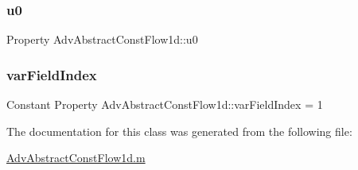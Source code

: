 \subsubsection{\texorpdfstring{u0}{u0}}
{\footnotesize\ttfamily Property Adv\+Abstract\+Const\+Flow1d\+::u0}

\mbox{\label{class_adv_abstract_const_flow1d_aedeec44e03a65428754c8db3310e48e0}} 
\subsubsection{\texorpdfstring{var\+Field\+Index}{varFieldIndex}}
{\footnotesize\ttfamily Constant Property Adv\+Abstract\+Const\+Flow1d\+::var\+Field\+Index = 1}



The documentation for this class was generated from the following file\+:\begin{DoxyCompactItemize}
\item 
\hyperlink{_adv_abstract_const_flow1d_8m}{Adv\+Abstract\+Const\+Flow1d.\+m}\end{DoxyCompactItemize}
